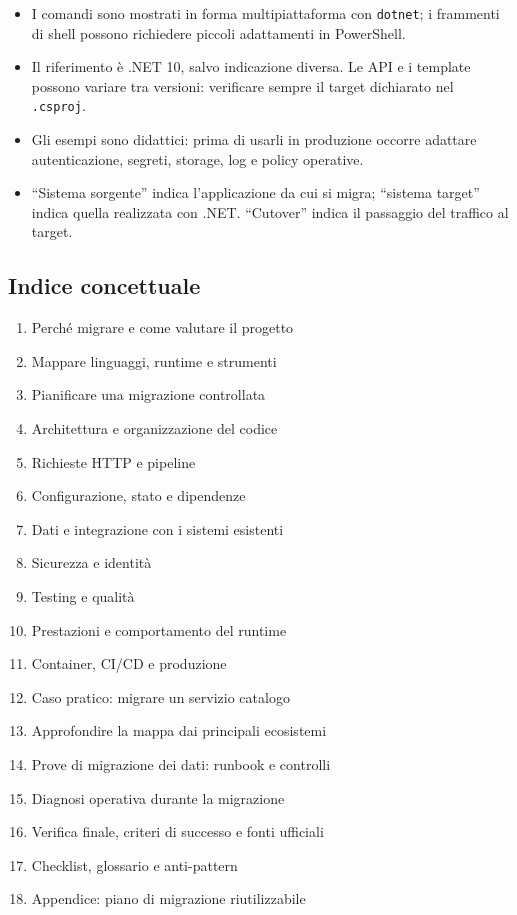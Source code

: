 \documentclass[
  italian,
  10pt,
]{book}
\providecommand{\tightlist}{%
  \setlength{\itemsep}{0pt}\setlength{\parskip}{0pt}}
\begin{document}
\begin{itemize}
\tightlist
\item
  I comandi sono mostrati in forma multipiattaforma con \texttt{dotnet};
  i frammenti di shell possono richiedere piccoli adattamenti in
  PowerShell.
\item
  Il riferimento è .NET 10, salvo indicazione diversa. Le API e i
  template possono variare tra versioni: verificare sempre il target
  dichiarato nel \texttt{.csproj}.
\item
  Gli esempi sono didattici: prima di usarli in produzione occorre
  adattare autenticazione, segreti, storage, log e policy operative.
\item
  ``Sistema sorgente'' indica l'applicazione da cui si migra; ``sistema
  target'' indica quella realizzata con .NET. ``Cutover'' indica il
  passaggio del traffico al target.
\end{itemize}

\subsection{Indice concettuale}\label{indice-concettuale}

\begin{enumerate}
\def\labelenumi{\arabic{enumi}.}
\tightlist
\item
  Perché migrare e come valutare il progetto
\item
  Mappare linguaggi, runtime e strumenti
\item
  Pianificare una migrazione controllata
\item
  Architettura e organizzazione del codice
\item
  Richieste HTTP e pipeline
\item
  Configurazione, stato e dipendenze
\item
  Dati e integrazione con i sistemi esistenti
\item
  Sicurezza e identità
\item
  Testing e qualità
\item
  Prestazioni e comportamento del runtime
\item
  Container, CI/CD e produzione
\item
  Caso pratico: migrare un servizio catalogo
\item
  Approfondire la mappa dai principali ecosistemi
\item
  Prove di migrazione dei dati: runbook e controlli
\item
  Diagnosi operativa durante la migrazione
\item
  Verifica finale, criteri di successo e fonti ufficiali
\item
  Checklist, glossario e anti-pattern
\item
  Appendice: piano di migrazione riutilizzabile
\end{enumerate}
\end{document}

